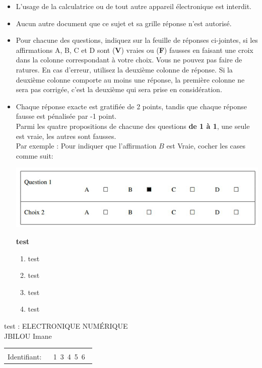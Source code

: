 \documentclass{book}%
\begin{document}
\begin{itemize}%
\item%
L'usage de la calculatrice ou de tout autre appareil électronique est interdit.%
\item%
Aucun autre document que ce sujet et sa grille réponse n'est autorisé.%
\item%
Pour chacune des questions, indiquez sur la feuille de réponses ci-jointes, si les affirmations A, B, C et D sont (\textbf{V}) vraies ou (\textbf{F}) fausses en faisant une croix dans la colonne correspondant à votre choix. Vous ne pouvez pas faire de ratures. En cas d'erreur, utilisez la deuxième colonne de réponse. Si la deuxième colonne comporte au moins une réponse, la première colonne ne sera pas corrigée, c'est la deuxième qui sera prise en considération.%
\item%
Chaque réponse exacte est gratifiée de 2 points, tandis que chaque réponse fausse est pénalisée par -1 point. \\ 	Parmi les quatre propositions de chacune des questions \textbf{de 1 à 1}, une seule est vraie, les autres sont fausses. \\ 	Par exemple : Pour indiquer que l'affirmation $B$ est Vraie, cocher les cases comme suit:  \\ \begin{center}	\includegraphics[scale=0.8]{reponses.png} \end{center}%
\thispagestyle{empty}%
\begin{exercise}%
\textbf{test }%
\begin{enumerate}[label=\textbf{\Alph*. }]%
\item%
test%
\item%
test%
\item%
test%
\item%
test%
\end{enumerate}%
\end{exercise}%
\end{itemize}%
\newpage%
\thispagestyle{empty}%
test : ELECTRONIQUE NUMÉRIQUE $\qquad \qquad \qquad \qquad \qquad \qquad \qquad \qquad$ JBILOU Imane%
\begin{flushright}%
\begin{tabular}{|l|}%
\hline%
 \\%
\thispagestyle{empty}%
Identifiant: $\quad$ {\Large 1~3~4~5~6~}%
 \\%
\hline%
\end{tabular}%
\end{flushright}%
\end{document}
